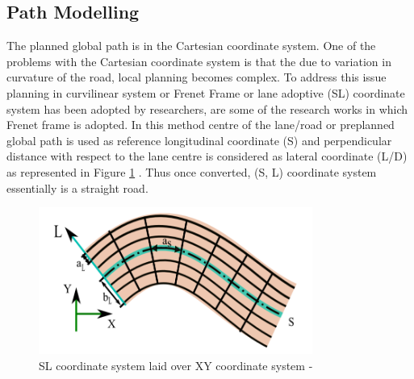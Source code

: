 \subsection{Path Modelling} \label{frenet_frame}

 The planned global path is in the Cartesian coordinate system. One of the problems with the Cartesian coordinate system is that the due to variation in curvature of the road, local planning becomes complex. To address this issue planning in curvilinear system or Frenet Frame or  lane adoptive (SL) coordinate system has been adopted by researchers, \cite{traj_planner_optimization} \cite{spatio_temporal_state_lattice} \cite{diss_shui_phd_thesis} \cite{real_time_traj_plan_article} \cite{volvo_reactive_traj} \cite{curvilinear_System_Automated_Drv} are some of the research works in which Frenet frame is adopted. In this method centre of the lane/road or preplanned global path is used as reference longitudinal coordinate (S) and perpendicular distance with respect to the lane centre is considered as lateral coordinate (L/D) as represented in Figure \ref{sl_over_xy} \cite{diss_shui_phd_thesis}.  Thus once converted, (S, L) coordinate system essentially is a straight road.
 
 \begin{figure}
    \centering
    \includegraphics[width=0.8\textwidth]{Images/sl_over_xy.png}
    \caption{SL coordinate system laid over XY coordinate system - \cite{diss_shui_phd_thesis}}
    \label{sl_over_xy}
\end{figure}
 
